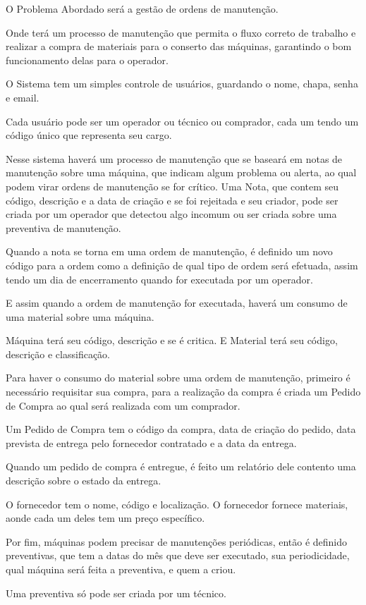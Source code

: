 \documentclass[a4paper,11pt]{article}
\begin{document}
\begin{FlushLeft}

    \small{

        O Problema Abordado será a gestão de ordens de manutenção.

        Onde terá um processo de manutenção que permita o fluxo correto de trabalho e realizar a compra de materiais para o conserto das máquinas, garantindo o bom funcionamento delas para o operador.

        O Sistema tem um simples controle de usuários, guardando o nome, chapa, senha e email.

        Cada usuário pode ser um operador ou técnico ou comprador, cada um tendo um código único que representa seu cargo.

        Nesse sistema haverá um processo de manutenção que se baseará em notas de manutenção sobre uma máquina, que indicam algum problema ou alerta, ao qual podem virar ordens de manutenção se for crítico.
        Uma Nota, que contem seu código, descrição e a data de criação e se foi rejeitada e seu criador, pode ser criada por um operador que detectou algo incomum ou ser criada sobre uma preventiva de manutenção.

        Quando a nota se torna em uma ordem de manutenção, é definido um novo código para a ordem como a definição de qual tipo de ordem será efetuada, assim tendo um dia de encerramento quando for executada por um operador.

        E assim quando a ordem de manutenção for executada, haverá um consumo de uma material sobre uma máquina.

        Máquina terá seu código, descrição e se é critica. E Material terá seu código, descrição e classificação.

        Para haver o consumo do material sobre uma ordem de manutenção, primeiro é necessário requisitar sua compra, para a realização da compra é criada um Pedido de Compra ao qual será realizada com um comprador.

        Um Pedido de Compra tem o código da compra, data de criação do pedido, data prevista de entrega pelo fornecedor contratado e a data da entrega.

        Quando um pedido de compra é entregue, é feito um relatório dele contento uma descrição sobre o estado da entrega.

        O fornecedor tem o nome, código e localização. O fornecedor fornece materiais, aonde cada um deles tem um preço específico.

        Por fim, máquinas podem precisar de manutenções periódicas, então é definido preventivas, que tem a datas do mês que deve ser executado, sua periodicidade, qual máquina será feita a preventiva, e quem a criou.

        Uma preventiva só pode ser criada por um técnico.
    }
\end{FlushLeft}
\end{document}
